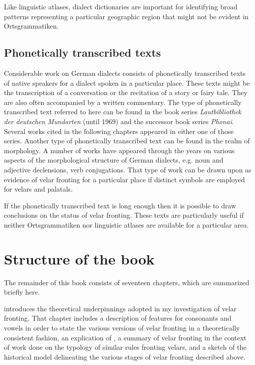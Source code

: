 Like linguistic atlases, dialect dictionaries are important for identifying broad patterns representing a particular geographic region that might not be evident in Ortsgrammatiken.

\subsection{Phonetically transcribed texts}\label{sec:1.6.3}

Considerable work on German dialects consists of phonetically transcribed texts of native speakers for a dialect spoken in a particular place. These texts might be the transcription of a conversation or the recitation of a story or fairy tale. They are also often accompanied by a written commentary. The type of phonetically transcribed text referred to here can be found in the book series \textit{Lautbibliothek der deutschen Mundarten} (until 1969) and the successor book series \textit{Phonai}. Several works cited in the following chapters appeared in either one of those series. Another type of phonetically transcribed text can be found in the realm of morphology. A number of works have appeared through the years on various aspects of the morphological structure of German dialects, e.g. noun and adjective declensions, verb conjugations. That type of work can be drawn upon as evidence of velar fronting for a particular place if distinct symbols are employed for velars and palatals.

If the phonetically transcribed text is long enough then it is possible to draw conclusions on the status of velar fronting. These texts are particularly useful if neither Ortsgrammatiken nor linguistic atlases are available for a particular area.

\section{{Structure} {of} {the} {book}}\label{sec:1.7}

The remainder of this book consists of seventeen chapters, which are summarized briefly here. 

 introduces the theoretical underpinnings adopted in my investigation of velar fronting. That chapter includes a description of features for consonants and vowels in order to state the various versions of velar fronting in a theoretically consistent fashion, an explication of , a summary of velar fronting in the context of work done on the typology of similar rules fronting velars, and a sketch of the historical model delineating the various stages of velar fronting described above. 

